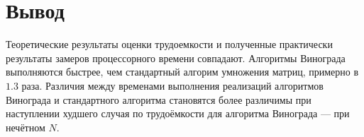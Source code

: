 \begin{center}
	\label{img:graph_sorted}
\end{center}
\newpage

\begin{center}
	\label{img:graph_sorted1}
\end{center}
\newpage


\section{Вывод}


Теоретические результаты оценки трудоемкости и полученные практически результаты замеров процессорного времени совпадают. Алгоритмы Винограда выполняются быстрее, чем стандартный алгорим умножения матриц, примерно в $1.3$ раза.  Различия между временами выполнения реализаций алгоритмов Винограда и стандартного алгоритма становятся более различимы при наступлении худшего случая по трудоёмкости для алгоритма Винограда --- при нечётном $N$.